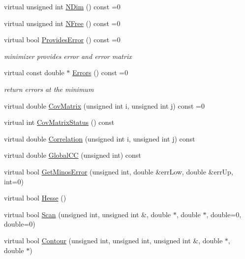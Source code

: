 \begin{DoxyCompactItemize}
virtual unsigned int \mbox{\hyperlink{classROOT_1_1Math_1_1Minimizer_aecb9b9ee5c6a9fd7db3196ae3ac5e335}{N\+Dim}} () const =0
\item 
virtual unsigned int \mbox{\hyperlink{classROOT_1_1Math_1_1Minimizer_a75a7cd8dc0d764ecc9d82dd8f83aab24}{N\+Free}} () const =0
\item 
virtual bool \mbox{\hyperlink{classROOT_1_1Math_1_1Minimizer_a71837caa295c76303c1a14679be1898d}{Provides\+Error}} () const =0
\begin{DoxyCompactList}\small\item\em minimizer provides error and error matrix \end{DoxyCompactList}\item 
virtual const double $\ast$ \mbox{\hyperlink{classROOT_1_1Math_1_1Minimizer_a42f71e22f16cf4c59b621cf7e1e75f3d}{Errors}} () const =0
\begin{DoxyCompactList}\small\item\em return errors at the minimum \end{DoxyCompactList}\item 
virtual double \mbox{\hyperlink{classROOT_1_1Math_1_1Minimizer_a01b0ec371972dab12ca3b9c962d952f8}{Cov\+Matrix}} (unsigned int i, unsigned int j) const =0
\item 
virtual int \mbox{\hyperlink{classROOT_1_1Math_1_1Minimizer_a5f5eab490760ff361d9c44369e9d754d}{Cov\+Matrix\+Status}} () const
\item 
virtual double \mbox{\hyperlink{classROOT_1_1Math_1_1Minimizer_a9ba2f4bc3c8c0e905f2c018e79809c0e}{Correlation}} (unsigned int i, unsigned int j) const
\item 
virtual double \mbox{\hyperlink{classROOT_1_1Math_1_1Minimizer_a6b50b0b0ccb0cb23da281ef978d145c5}{Global\+CC}} (unsigned int) const
\item 
virtual bool \mbox{\hyperlink{classROOT_1_1Math_1_1Minimizer_aeaef75b766eff7088939259c842ab056}{Get\+Minos\+Error}} (unsigned int, double \&err\+Low, double \&err\+Up, int=0)
\item 
virtual bool \mbox{\hyperlink{classROOT_1_1Math_1_1Minimizer_ae903e5936bef4ea7fac3301f9cdc50be}{Hesse}} ()
\item 
virtual bool \mbox{\hyperlink{classROOT_1_1Math_1_1Minimizer_a1e6e4b32d7338a7a08791cff67f54080}{Scan}} (unsigned int, unsigned int \&, double $\ast$, double $\ast$, double=0, double=0)
\item 
virtual bool \mbox{\hyperlink{classROOT_1_1Math_1_1Minimizer_aeb8855190ff2e37911c38ed839f2043c}{Contour}} (unsigned int, unsigned int, unsigned int \&, double $\ast$, double $\ast$)

\end{DoxyCompactItemize}
